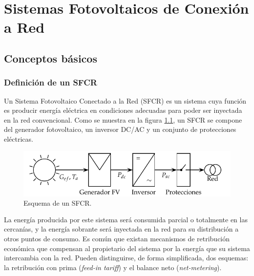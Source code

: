 
\chapter{Sistemas Fotovoltaicos de Conexión a Red}
\label{cha:SFCR}


\section{Conceptos básicos}

\subsection{Definición de un SFCR}

Un Sistema Fotovoltaico Conectado a la Red (SFCR) es un sistema cuya
función es producir energía eléctrica en condiciones adecuadas para
poder ser inyectada en la red convencional. Como se muestra en la
figura \ref{fig:EsquemaSFCR}, un SFCR se compone del generador
fotovoltaico, un inversor DC/AC y un conjunto de protecciones
eléctricas. 

%
\begin{figure}
\includegraphics{../figs/EsquemaSFCR}

\caption{Esquema de un SFCR.\label{fig:EsquemaSFCR}}

\end{figure}

La energía producida por este sistema será consumida parcial o
totalmente en las cercanías, y la energía sobrante será inyectada en
la red para su distribución a otros puntos de consumo. Es común que
existan mecanismos de retribución económica que compensan al
propietario del sistema por la energía que su sistema intercambia con
la red. Pueden distinguirse, de forma simplificada, dos esquemas: la
retribución con prima (\emph{feed-in tariff}) y el balance neto
(\emph{net-metering}). 

